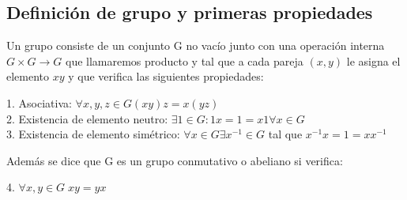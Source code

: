 \subsection{Definición de grupo y primeras propiedades}

\begin{ndef}
Un grupo consiste de un conjunto G no vacío junto con una operación interna $G \times G \rightarrow G$ que llamaremos producto y tal que a cada pareja $(x,y)$ le asigna el elemento $xy$ y que verifica las siguientes propiedades:

1. Asociativa: $\forall x,y,z \in G (xy)z = x(yz)$ \\
2. Existencia de elemento neutro: $\exists 1 \in G : 1x = 1 = x1 \forall x \in G$ \\
3. Existencia de elemento simétrico: $\forall x \in G \exists x^{-1} \in G$ tal que $x^{-1}x = 1 = xx^{-1}$ 

Además se dice que G es un grupo conmutativo o abeliano si verifica:

4. $\forall x,y \in G \; xy = yx$
\end{ndef}


